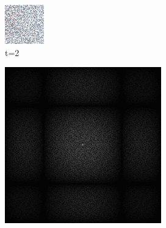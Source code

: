 \begin{figure}[H]
\begin{tcolorbox}[boxrule=4pt,sharp corners=downhill,title=Retargeting]
\begin{subfigure}[b]{0.2\textwidth}
        \includegraphics[width=\textwidth]{content/TemporalerAlg/Bilder/Retargeting/Ausschnitte/Ausschnitt2.png}
        \caption{t=2}
        \label{pic:sorting_retarget_t2}
    \end{subfigure}
    \begin{subfigure}[b]{0.2\textwidth}
        \centering
        \includegraphics[width=\textwidth]{content/TemporalerAlg/Bilder/Retargeting/Spektren/Ausschnitt2.png}

\end{subfigure}
\end{tcolorbox}
\end{figure}

